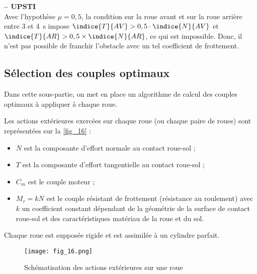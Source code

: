 \ifprof
\begin{corrige}\textbf{ -- UPSTI}\\ 
Avec l’hypothèse $\mu = 0,5$, la condition sur la roue avant et sur la roue arrière entre 3 et \SI{4}{s} impose $\indice{T}{AV}  > 0,5 \cdot  \indice{N}{AV}$  et $\indice{T}{AR} > 0,5 \times \indice{N}{AR}$, ce qui est impossible. Donc, il n’est pas possible de franchir l’obstacle avec un tel coefficient de frottement.
\end{corrige}
\else
\fi


\subsection{Sélection des couples optimaux}

\begin{obj}
Dans cette sous-partie, on met en place un algorithme de calcul des couples optimaux à
appliquer à chaque roue.
\end{obj}

\ifprof\else
Les actions extérieures exercées sur chaque roue (ou chaque paire de roues) sont représentées
sur la \autoref{fig_16} :
\begin{itemize}
\item $N$ est la composante d'effort normale au contact roue-sol ;
\item $T$ est la composante d'effort tangentielle au contact roue-sol ;
\item $C_m$ est le couple moteur ;
\item $M_r=k N$ est le couple résistant de frottement (résistance au roulement) avec $k$ un
coefficient constant dépendant de la géométrie de la surface de contact roue-sol et des
caractéristiques matériau de la roue et du sol.
\end{itemize}

Chaque roue est supposée rigide et est assimilée à un cylindre parfait.

\begin{figure}[H]
\centering
\texttt{[image: fig\_16.png]}
\caption{Schématisation des actions extérieures sur une roue\label{fig_16}}
\end{figure}
\fi

